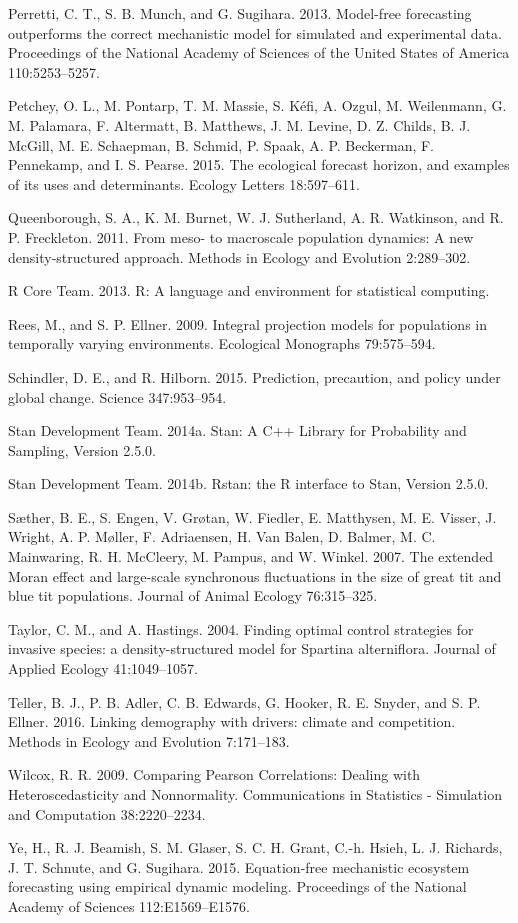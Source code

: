 \documentclass[12pt,]{article}
\begin{document}
Perretti, C. T., S. B. Munch, and G. Sugihara. 2013. Model-free
forecasting outperforms the correct mechanistic model for simulated and
experimental data. Proceedings of the National Academy of Sciences of
the United States of America 110:5253--5257.

Petchey, O. L., M. Pontarp, T. M. Massie, S. K{é}fi, A. Ozgul, M.
Weilenmann, G. M. Palamara, F. Altermatt, B. Matthews, J. M. Levine, D.
Z. Childs, B. J. McGill, M. E. Schaepman, B. Schmid, P. Spaak, A. P.
Beckerman, F. Pennekamp, and I. S. Pearse. 2015. The ecological forecast
horizon, and examples of its uses and determinants. Ecology Letters
18:597--611.

Queenborough, S. A., K. M. Burnet, W. J. Sutherland, A. R. Watkinson,
and R. P. Freckleton. 2011. From meso- to macroscale population
dynamics: A new density-structured approach. Methods in Ecology and
Evolution 2:289--302.

R Core Team. 2013. R: A language and environment for statistical
computing.

Rees, M., and S. P. Ellner. 2009. Integral projection models for
populations in temporally varying environments. Ecological Monographs
79:575--594.

Schindler, D. E., and R. Hilborn. 2015. Prediction, precaution, and
policy under global change. Science 347:953--954.

Stan Development Team. 2014a. Stan: A C++ Library for Probability and
Sampling, Version 2.5.0.

Stan Development Team. 2014b. Rstan: the R interface to Stan, Version
2.5.0.

S{æ}ther, B. E., S. Engen, V. Gr{ø}tan, W. Fiedler, E. Matthysen, M. E.
Visser, J. Wright, A. P. M{ø}ller, F. Adriaensen, H. {Van Balen}, D.
Balmer, M. C. Mainwaring, R. H. McCleery, M. Pampus, and W. Winkel.
2007. The extended Moran effect and large-scale synchronous fluctuations
in the size of great tit and blue tit populations. Journal of Animal
Ecology 76:315--325.

Taylor, C. M., and A. Hastings. 2004. Finding optimal control strategies
for invasive species: a density-structured model for Spartina
alterniflora. Journal of Applied Ecology 41:1049--1057.

Teller, B. J., P. B. Adler, C. B. Edwards, G. Hooker, R. E. Snyder, and
S. P. Ellner. 2016. Linking demography with drivers: climate and
competition. Methods in Ecology and Evolution 7:171--183.

Wilcox, R. R. 2009. Comparing Pearson Correlations: Dealing with
Heteroscedasticity and Nonnormality. Communications in Statistics -
Simulation and Computation 38:2220--2234.

Ye, H., R. J. Beamish, S. M. Glaser, S. C. H. Grant, C.-h. Hsieh, L. J.
Richards, J. T. Schnute, and G. Sugihara. 2015. Equation-free
mechanistic ecosystem forecasting using empirical dynamic modeling.
Proceedings of the National Academy of Sciences 112:E1569--E1576.
\end{document}
